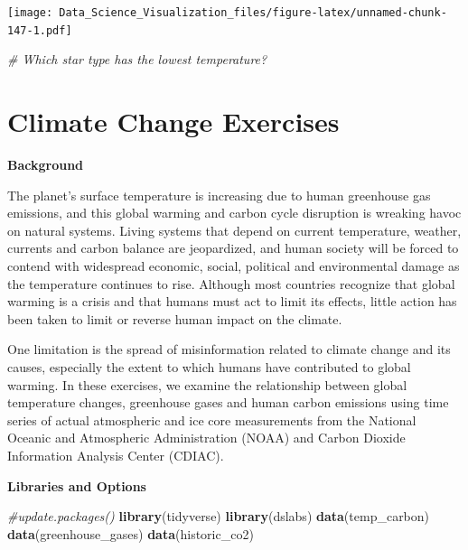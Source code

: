 \documentclass[
]{article}
\newenvironment{Shaded}{\begin{snugshade}}{\end{snugshade}}
\newcommand{\CommentTok}[1]{\textcolor[rgb]{0.56,0.35,0.01}{\textit{#1}}}
\newcommand{\KeywordTok}[1]{\textcolor[rgb]{0.13,0.29,0.53}{\textbf{#1}}}
\newcommand{\NormalTok}[1]{#1}
\begin{document}
\texttt{[image: Data\_Science\_Visualization\_files/figure-latex/unnamed-chunk-147-1.pdf]}

\begin{Shaded}
\begin{Highlighting}[]
\CommentTok{# Which star type has the lowest temperature?}
\end{Highlighting}
\end{Shaded}

\hypertarget{climate-change-exercises}{%
\section{Climate Change Exercises}\label{climate-change-exercises}}

\textbf{Background}

The planet's surface temperature is increasing due to human greenhouse
gas emissions, and this global warming and carbon cycle disruption is
wreaking havoc on natural systems. Living systems that depend on current
temperature, weather, currents and carbon balance are jeopardized, and
human society will be forced to contend with widespread economic,
social, political and environmental damage as the temperature continues
to rise. Although most countries recognize that global warming is a
crisis and that humans must act to limit its effects, little action has
been taken to limit or reverse human impact on the climate.

One limitation is the spread of misinformation related to climate change
and its causes, especially the extent to which humans have contributed
to global warming. In these exercises, we examine the relationship
between global temperature changes, greenhouse gases and human carbon
emissions using time series of actual atmospheric and ice core
measurements from the National Oceanic and Atmospheric Administration
(NOAA) and Carbon Dioxide Information Analysis Center (CDIAC).

\textbf{Libraries and Options}

\begin{Shaded}
\begin{Highlighting}[]
\CommentTok{#update.packages()}
\KeywordTok{library}\NormalTok{(tidyverse)}
\KeywordTok{library}\NormalTok{(dslabs)}
\KeywordTok{data}\NormalTok{(temp_carbon)}
\KeywordTok{data}\NormalTok{(greenhouse_gases)}
\KeywordTok{data}\NormalTok{(historic_co2)}
\end{Highlighting}
\end{Shaded}
\end{document}
